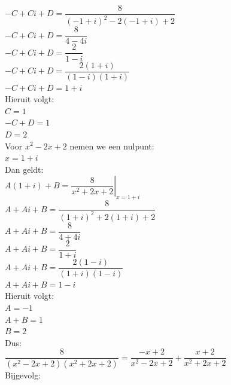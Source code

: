 \documentclass[a4paper]{article}
\begin{document}
$-C+Ci+D
=
\dfrac{8}{(-1+i)^2-2(-1+i)+2}$\\

$-C+Ci+D
=
\dfrac{8}{4-4i}$\\

$-C+Ci+D
=
\dfrac{2}{1-i}$\\

$-C+Ci+D
=
\dfrac{2(1+i)}{(1-i)(1+i)}$\\

$-C+Ci+D=1+i$\\

Hieruit volgt:\\

$C=1$\\

$-C+D=1$\\

$D=2$\\

Voor $x^2-2x+2$ nemen we een nulpunt:\\

$x=1+i$\\

Dan geldt:\\

$A(1+i)+B
=
\left.
\dfrac{8}{x^2+2x+2}
\right|_{x=1+i}$\\

$A+Ai+B
=
\dfrac{8}{(1+i)^2+2(1+i)+2}$\\

$A+Ai+B
=
\dfrac{8}{4+4i}$\\

$A+Ai+B
=
\dfrac{2}{1+i}$\\

$A+Ai+B
=
\dfrac{2(1-i)}{(1+i)(1-i)}$\\

$A+Ai+B=1-i$\\

Hieruit volgt:\\

$A=-1$\\

$A+B=1$\\

$B=2$\\

Dus:\\

$\dfrac{8}{(x^2-2x+2)(x^2+2x+2)}
=
\dfrac{-x+2}{x^2-2x+2}
+
\dfrac{x+2}{x^2+2x+2}$\\

Bijgevolg:\\
\end{document}
